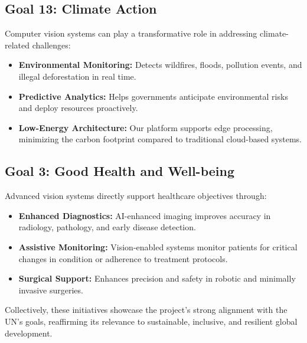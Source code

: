 \documentclass[11pt, a4paper]{article}
\theoremstyle{plain}
\begin{document}
\subsection*{Goal 13: Climate Action}

Computer vision systems can play a transformative role in addressing climate-related challenges:

\begin{itemize}
    \item \textbf{Environmental Monitoring:} Detects wildfires, floods, pollution events, and illegal deforestation in real time.
    \item \textbf{Predictive Analytics:} Helps governments anticipate environmental risks and deploy resources proactively.
    \item \textbf{Low-Energy Architecture:} Our platform supports edge processing, minimizing the carbon footprint compared to traditional cloud-based systems.
\end{itemize}

\subsection*{Goal 3: Good Health and Well-being}

Advanced vision systems directly support healthcare objectives through:

\begin{itemize}
    \item \textbf{Enhanced Diagnostics:} AI-enhanced imaging improves accuracy in radiology, pathology, and early disease detection.
    \item \textbf{Assistive Monitoring:} Vision-enabled systems monitor patients for critical changes in condition or adherence to treatment protocols.
    \item \textbf{Surgical Support:} Enhances precision and safety in robotic and minimally invasive surgeries.
\end{itemize}

\noindent Collectively, these initiatives showcase the project's strong alignment with the UN's goals, reaffirming its relevance to sustainable, inclusive, and resilient global development.


\end{document}
